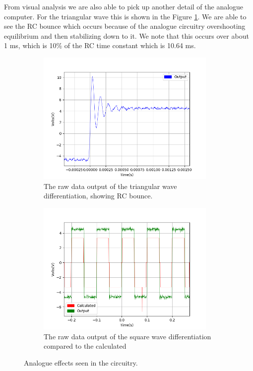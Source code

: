 From visual analysis we are also able to pick up another detail of the analogue computer. For the triangular wave this is shown in the Figure \ref{fig:diff_triangular_analouge}. We are able to see the RC bounce which occurs because of the analogue circuitry overshooting equilibrium and then stabilizing down to it. We note that this occurs over about 1 ms, which is 10\% of the RC time constant which is 10.64 ms. \newline

\begin{figure}[h!]
\centering
\begin{subfigure}[t]{.475\textwidth}
  \centering
  \includegraphics[width=0.95\textwidth, height=0.22\textheight]{figures/Differentiation/scope_16raw_out.png}
  \caption{The raw data output of the triangular wave differentiation, showing RC bounce.}
 \label{fig:diff_triangular_analouge}
\end{subfigure}\hfill
\begin{subfigure}[t]{.475\textwidth}
  \centering
  \includegraphics[width=0.95\textwidth, height=0.22\textheight]{figures/Differentiation/scope_15_calc_behind.png}
  \caption{The raw data output of the square wave differentiation compared to the calculated}
\label{fig:diff_square_analouge}
\end{subfigure}
\caption{Analogue effects seen in the circuitry.}
\label{fig:diff_analouge}
\end{figure}

